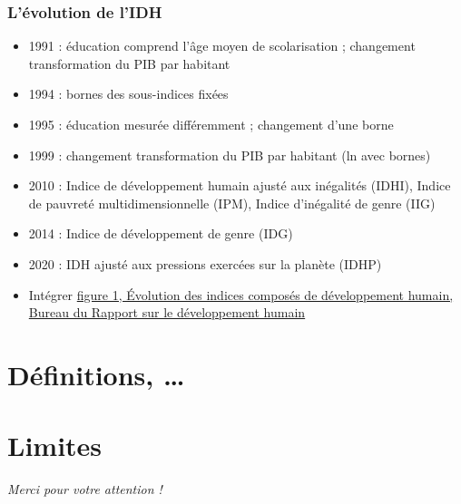 \documentclass[french]{beamer}
\begin{document}
\begin{frame}
	\frametitle{L’évolution de l’IDH}
	\begin{itemize}
		\item 1991 : éducation comprend l’âge moyen de scolarisation ; changement transformation du PIB par habitant
		\item 1994 : bornes des sous-indices fixées
		\item 1995 : éducation mesurée différemment ; changement d’une borne
		\item 1999 : changement transformation du PIB par habitant (ln avec bornes)
		\item 2010 : Indice de développement humain ajusté aux inégalités (IDHI), Indice de pauvreté multidimensionnelle (IPM), Indice d’inégalité de genre (IIG)
		\item 2014 : Indice de développement de genre (IDG)
		\item 2020 : IDH ajusté aux pressions exercées sur la planète (IDHP) %
    \item Intégrer \href{https://hdr.undp.org/system/files/documents/2018humandevelopmentstatisticalupdatefr.pdf}{figure 1, Évolution des indices composés de développement humain, Bureau du Rapport sur le développement humain}
	\end{itemize}
\end{frame}

\section{Définitions, …}

\section{Limites}

\begin{frame}[plain]
	\addtocounter{framenumber}{-1}
	\begin{center}
		\huge
		\textit{Merci pour votre attention !}
	\end{center}
\end{frame}
\end{document}
